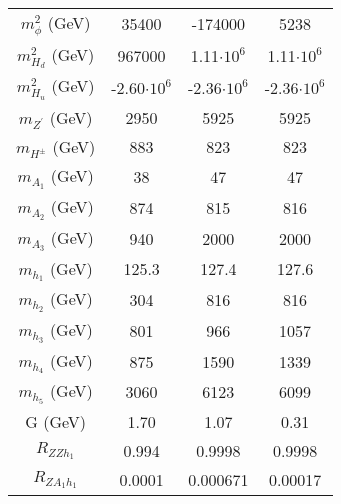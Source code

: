 \documentclass[12pt,a4paper]{article}
\begin{document}
\begin{table}
\begin{tabular}{| c || c | c | c |}
$m_\phi^2$ (GeV)                   &    35400             & 	-174000               & 	5238                                   \\   
$m_{H_d}^2$ (GeV)                  &    967000            & 	1.11$\cdot 10^6$             & 	1.11$\cdot 10^6$                               \\   
$m_{H_u}^2$ (GeV)                  &   -2.60$\cdot 10^6$         & 	-2.36$\cdot 10^6$            & 	-2.36$\cdot 10^6$                              \\   
$m_{Z^\prime}$ (GeV)                 &    2950              & 	5925                    & 	5925                                      \\   
$m_{H^\pm}$ (GeV)                   &    883               & 	823                    & 	823                                      \\   
$m_{A_1}$ (GeV)                    &	38                & 	47                    & 	47                                    \\  
$m_{A_2}$ (GeV)                    &	874               & 	815                   & 	816                                   \\   
$m_{A_3}$ (GeV)                    &	940               & 	2000                   & 	2000                                  \\   
$m_{h_1}$ (GeV)                    &	125.3             & 	127.4                 & 	127.6                                  \\
$m_{h_2}$ (GeV)                    &	304               & 	816                   & 	816                                    \\  
$m_{h_3}$ (GeV)                    &	801               & 	966                   & 	1057                                   \\ 
$m_{h_4}$ (GeV)                    &	875               & 	1590                  & 	1339                                   \\ 
$m_{h_5}$ (GeV)                    &	3060              & 	6123                  & 	6099                                   \\ 
G (GeV)                          & 	1.70             & 	1.07                  & 	0.31                                   \\ 
$R_{ZZh_1}$                        &     0.994             & 	0.9998                  & 	0.9998                                   \\   
$R_{ZA_1h_1}$                       & 	0.0001           & 	0.000671                 & 	0.00017                                \\

\end{tabular}
\end{table}
\end{document}
